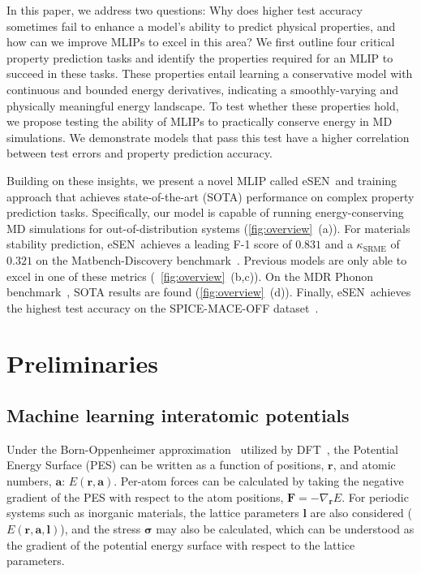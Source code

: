 \documentclass[twocolumn]{fairmeta}
\newcommand{\ourmodel}{eSEN}
\begin{document}
In this paper, we address two questions: Why does higher test accuracy sometimes fail to enhance a model's ability to predict physical properties, and how can we improve MLIPs to excel in this area? We first outline four critical property prediction tasks and identify the properties required for an MLIP to succeed in these tasks. These properties entail learning a conservative model with continuous and bounded energy derivatives, indicating a smoothly-varying and physically meaningful energy landscape. To test whether these properties hold, we propose testing the ability of MLIPs to practically conserve energy in MD simulations. We demonstrate models that pass this test have a higher correlation between test errors and property prediction accuracy.  

Building on these insights, we present a novel MLIP called \ourmodel~and training approach that achieves state-of-the-art (SOTA) performance on complex property prediction tasks. Specifically, our model is capable of running energy-conserving MD simulations for out-of-distribution systems (\cref{fig:overview}~(a)). For materials stability prediction, \ourmodel~achieves a leading F-1 score of $0.831$ and a $\kappa_{\mathrm{SRME}}$ of $0.321$ on the Matbench-Discovery benchmark~\citep{riebesell2023matbench, pota2024thermal}. Previous models are only able to excel in one of these metrics (~\cref{fig:overview}~(b,c)). On the MDR Phonon benchmark~\citep{loew2024universal}, SOTA results are found (\cref{fig:overview}~(d)). Finally, \ourmodel~achieves the highest test accuracy on the SPICE-MACE-OFF dataset~\citep{kovacs2023mace}.


\section{Preliminaries}
\label{sec:related}


\subsection{Machine learning interatomic potentials} 

Under the Born-Oppenheimer approximation~\citep{oppenheimer1927quantentheorie} utilized by DFT~\citep{parr1979local}, the Potential Energy Surface (PES) can be written as a function of positions, $\bm r$, and atomic numbers, $\bm a$: $E(\bm r, \bm a)$. Per-atom forces can be calculated by taking the negative gradient of the PES with respect to the atom positions, $\bm F = -\nabla_{\bm r} E$. For periodic systems such as inorganic materials, the lattice parameters $\bm l$ are also considered ($E(\bm r, \bm a, \bm l)$), and the stress $\bm \sigma$ may also be calculated, which can be understood as the gradient of the potential energy surface with respect to the lattice parameters. 
\end{document}
